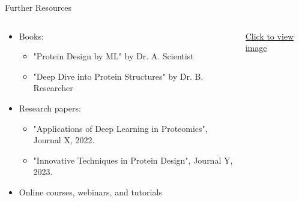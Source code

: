 \documentclass[presentation]{beamer}
\begin{document}
\begin{frame}[label={sec:org15f31df}]{Further Resources}
\begin{columns}
\begin{column}{0.6\columnwidth}
\begin{itemize}
\item Books: 
\begin{itemize}
\item "Protein Design by ML" by Dr. A. Scientist
\item "Deep Dive into Protein Structures" by Dr. B. Researcher
\end{itemize}
\item Research papers: 
\begin{itemize}
\item "Applications of Deep Learning in Proteomics", Journal X, 2022.
\item "Innovative Techniques in Protein Design", Journal Y, 2023.
\end{itemize}
\item Online courses, webinars, and tutorials
\end{itemize}
\end{column}
\begin{column}{0.4\columnwidth}
\begin{center}
\href{path\_to\_resources\_image}{Click to view image}
\end{center}
\end{column}
\end{columns}
\end{frame}
\end{document}
